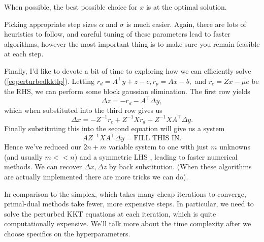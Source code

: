 \documentclass[11pt]{article}
\numberwithin{equation}{section}
\theoremstyle{definition}
\begin{document}
When possible, the best possible choice for $x$ is at the optimal solution.

Picking appropriate step sizes $\alpha$ and $\sigma$ is much easier. Again, there are lots of heuristics to follow, and careful tuning of these parameters lead to faster algorithms, however the most important thing is to make sure you remain feasible at each step.

Finally, I'd like to devote a bit of time to exploring how we can efficiently solve (\ref{eqperturbedkktlp}). Letting $r_d=A^\top y+z-c, r_p= Ax-b,$ and $r_c=Zx-\mu e$ be the RHS, we can perform some block gaussian elimination. The first row yields
\begin{equation}
    \Delta z=-r_d-A^\top\Delta y,
\end{equation}
which when substituted into the third row gives us
\begin{equation}
    \Delta x=-Z^{-1}r_c+Z^{-1}Xr_d+Z^{-1}XA^\top\Delta y.
\end{equation}
Finally substituting this into the second equation will give us a system
\begin{equation}
    AZ^{-1}XA^\top\Delta y=\text{FILL THIS IN}.
\end{equation}
Hence we've reduced our $2n+m$ variable system to one with just $m$ unknowns (and usually $m<<n$) and a symmetric LHS , leading to faster numerical methods. We can recover $\Delta x, \Delta z$ by back substitution. (When these algorithms are actually implemented there are more tricks we can do).

In comparison to the simplex, which takes many cheap iterations to converge, primal-dual methods take fewer, more expensive steps. In particular, we need to solve the perturbed KKT equations at each iteration, which is quite computationally expensive. We'll talk more about the time complexity after we choose specifics on the hyperparameters.
\end{document}
